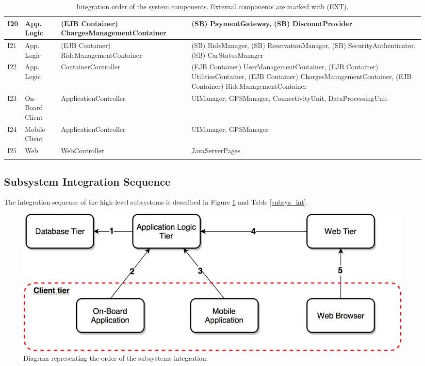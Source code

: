 \begin{longtable}{p{} | p{} | p{} | p{}}
\hline
I20 & App. Logic & (EJB Container) ChargesManagementContainer & (SB) PaymentGateway, (SB) DiscountProvider \\
\hline
I21 & App. Logic & (EJB Container) RideManagementContainer & (SB) RideManager, (SB) ReservationManager, (SB) SecurityAuthenticator, (SB) CarStatusManager \\
\hline
I22 & App. Logic & ContainerController & (EJB Container) UserManagementContainer, (EJB Container) UtilitiesContainer, (EJB Container) ChargesManagementContainer, (EJB Container) RideManagementContainer \\
\hline
I23 & On-Board Client & ApplicationController & UIManager, GPSManager, ConnectivityUnit, DataProcessingUnit \\
\hline
I24 & Mobile Client & ApplicationController & UIManager, GPSManager \\
\hline
I25 & Web & WebController & JavaServerPages \\
\hline
\caption{Integration order of the system components. External components are marked with (EXT).}
\label{software_int}
\end{longtable}

\subsection{Subsystem Integration Sequence}
The integration sequence of the high-level subsystems is described in Figure \ref{h_level_subsys} and Table \ref{subsys_int}.

\begin{figure}[H]
\begin{center}
		\includegraphics[width=\textwidth]{./integration_strategy/diagrams/h_level_subsys.png}
		\caption{Diagram representing the order of the subsystems integration.}
		\label{h_level_subsys}
\end{center}
\end{figure}

